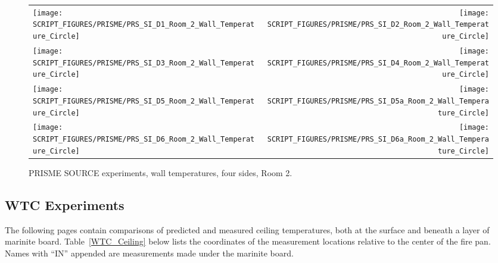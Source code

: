\begin{figure}[p]
\begin{tabular*}{\textwidth}{l@{\extracolsep{\fill}}r}
\texttt{[image: SCRIPT\_FIGURES/PRISME/PRS\_SI\_D1\_Room\_2\_Wall\_Temperature\_Circle]} &
\texttt{[image: SCRIPT\_FIGURES/PRISME/PRS\_SI\_D2\_Room\_2\_Wall\_Temperature\_Circle]} \\
\texttt{[image: SCRIPT\_FIGURES/PRISME/PRS\_SI\_D3\_Room\_2\_Wall\_Temperature\_Circle]} &
\texttt{[image: SCRIPT\_FIGURES/PRISME/PRS\_SI\_D4\_Room\_2\_Wall\_Temperature\_Circle]} \\
\texttt{[image: SCRIPT\_FIGURES/PRISME/PRS\_SI\_D5\_Room\_2\_Wall\_Temperature\_Circle]} &
\texttt{[image: SCRIPT\_FIGURES/PRISME/PRS\_SI\_D5a\_Room\_2\_Wall\_Temperature\_Circle]} \\
\texttt{[image: SCRIPT\_FIGURES/PRISME/PRS\_SI\_D6\_Room\_2\_Wall\_Temperature\_Circle]} &
\texttt{[image: SCRIPT\_FIGURES/PRISME/PRS\_SI\_D6a\_Room\_2\_Wall\_Temperature\_Circle]}
\end{tabular*}
\caption{PRISME SOURCE experiments, wall temperatures, four sides, Room 2.}
\label{PRISME_SOURCE_Wall_Circle_Room_2}
\end{figure}

\clearpage


\subsection{WTC Experiments}

The following pages contain comparisons of predicted and measured ceiling temperatures, both at the surface and beneath a layer of marinite board. Table~\ref{WTC_Ceiling} below lists the coordinates of the measurement locations relative to the center of the fire pan. Names with ``IN'' appended are measurements made under the marinite board.


